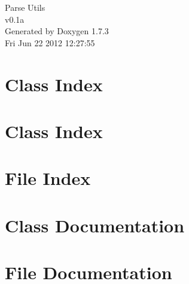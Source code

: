 \documentclass[a4paper]{book}
\begin{document}
\hypersetup{pageanchor=false}
\begin{titlepage}
\vspace*{7cm}
\begin{center}
{\Large Parse Utils \\[1ex]\large v0.1a }\\
\vspace*{1cm}
{\large Generated by Doxygen 1.7.3}\\
\vspace*{0.5cm}
{\small Fri Jun 22 2012 12:27:55}\\
\end{center}
\end{titlepage}
\clearemptydoublepage
{}
\tableofcontents
\clearemptydoublepage
{}
\hypersetup{pageanchor=true}
\chapter{Class Index}

\chapter{Class Index}

\chapter{File Index}

\chapter{Class Documentation}












\chapter{File Documentation}




































\printindex
\end{document}
